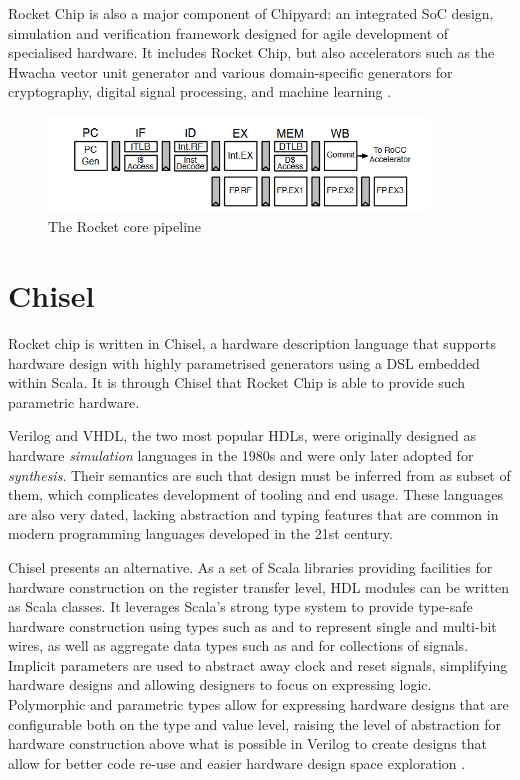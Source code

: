 Rocket Chip is also a major component of Chipyard: an integrated SoC design, simulation and verification framework designed for agile development of specialised hardware. It includes Rocket Chip, but also accelerators such as the Hwacha vector unit generator and various domain-specific generators for cryptography, digital signal processing, and machine learning \cite{chipyard}.

\begin{figure}[h!]
    \centering
    \includegraphics[width=0.9\textwidth]{../img/rocket-core.png}
    \caption{The Rocket core pipeline \cite{rocketchip}}
    \label{fig:rocket-core}
\end{figure}

\section{Chisel}
Rocket chip is written in Chisel, a hardware description language that supports hardware design with highly parametrised generators using a DSL embedded within Scala. It is through Chisel that Rocket Chip is able to provide such parametric hardware.

Verilog and VHDL, the two most popular HDLs, were originally designed as hardware \textit{simulation} languages in the 1980s and were only later adopted for \textit{synthesis}. Their semantics are such that design must be inferred from as subset of them, which complicates development of tooling and end usage. These languages are also very dated, lacking abstraction and typing features that are common in modern programming languages developed in the 21st century.

Chisel presents an alternative. As a set of Scala libraries providing facilities for hardware construction on the register transfer level, HDL modules can be written as Scala classes. It leverages Scala's strong type system to provide type-safe hardware construction using types such as  and  to represent single and multi-bit wires, as well as aggregate data types such as  and  for collections of signals. Implicit parameters are used to abstract away clock and reset signals, simplifying hardware designs and allowing designers to focus on expressing logic. Polymorphic and parametric types allow for expressing hardware designs that are configurable both on the type and value level, raising the level of abstraction for hardware construction above what is possible in Verilog to create designs that allow for better code re-use and easier hardware design space exploration \cite{chisel}.


